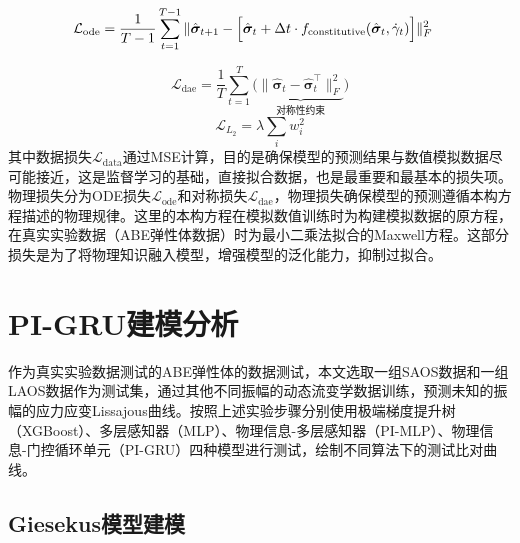 \begin{equation}
  \mathcal{L}_{\text{ode}} = \frac{1}{T-1} \sum_{t=1}^{T-1}
  \|\hat{\bm{\sigma}}_{t+1} - \Bigl[
    \hat{\bm{\sigma}}_t + \Delta t \cdot
    f_{\text{constitutive}}(\hat{\bm{\sigma}}_t, \dot{\gamma}_t)
    \Bigr] \|_F^2
  \quad
\end{equation}

\begin{equation}
  \mathcal{L}_{\text{dae}} = \frac{1}{T} \sum_{t=1}^T \Biggl(
  \underbrace{\|\hat{\bm{\sigma}}_t - \hat{\bm{\sigma}}_t^\top\|_F^2}_{\text{对称性约束}}
  \Biggr)
\end{equation}
\begin{equation}
  \mathcal{L}_{L_{2}} = \lambda \sum_{i} w_i^2
\end{equation}
其中数据损失$\mathcal{L}_{\text{data}}$通过MSE计算，目的是确保模型的预测结果与数值模拟数据尽可能接近，这是监督学习的基础，直接拟合数据，也是最重要和最基本的损失项。物理损失分为ODE损失$\mathcal{L}_{\text{ode}}$和对称损失$\mathcal{L}_{\text{dae}}$，物理损失确保模型的预测遵循本构方程描述的物理规律。这里的本构方程在模拟数值训练时为构建模拟数据的原方程，在真实实验数据（ABE弹性体数据）时为最小二乘法拟合的Maxwell方程。这部分损失是为了将物理知识融入模型，增强模型的泛化能力，抑制过拟合。
\section{PI-GRU建模分析}
作为真实实验数据测试的ABE弹性体的数据测试，本文选取一组SAOS数据和一组LAOS数据作为测试集，通过其他不同振幅的动态流变学数据训练，预测未知的振幅的应力应变Lissajous曲线。按照上述实验步骤分别使用极端梯度提升树（XGBoost）、多层感知器（MLP）、物理信息-多层感知器（PI-MLP）、物理信息-门控循环单元（PI-GRU）四种模型进行测试，绘制不同算法下的测试比对曲线。
\subsection{Giesekus模型建模}
